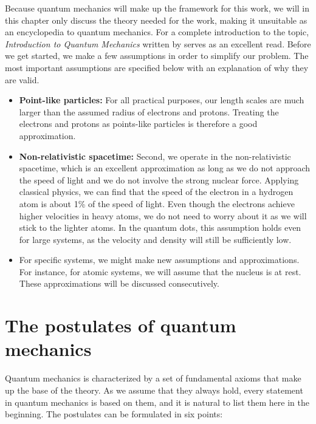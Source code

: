 Because quantum mechanics will make up the framework for this work, we will in this chapter only discuss the theory needed for the work, making it unsuitable as an encyclopedia to quantum mechanics. For a complete introduction to the topic, \textit{Introduction to Quantum Mechanics} written by \citet{griffiths_introduction_2005} serves as an excellent read. Before we get started, we make a few assumptions in order to simplify our problem. The most important assumptions are specified below with an explanation of why they are valid.

\begin{itemize}
	\item \textbf{Point-like particles:} For all practical purposes, our length scales are much larger than the assumed radius of electrons and protons. Treating the electrons and protons as points-like particles is therefore a good approximation. 
	
	\item \textbf{Non-relativistic spacetime:}  Second, we operate in the non-relativistic spacetime, which is an excellent approximation as long as we do not approach the speed of light and we do not involve the strong nuclear force. Applying classical physics, we can find that the speed of the electron in a hydrogen atom is about 1\% of the speed of light. Even though the electrons achieve higher velocities in heavy atoms, we do not need to worry about it as we will stick to the lighter atoms. In the quantum dots, this assumption holds even for large systems, as the velocity and density will still be sufficiently low.
	
	\item For specific systems, we might make new assumptions and approximations. For instance, for atomic systems, we will assume that the nucleus is at rest. These approximations will be discussed consecutively. 
\end{itemize}

\section{The postulates of quantum mechanics} \label{sec:postulates}
Quantum mechanics is characterized by a set of fundamental axioms that make up the base of the theory. As we assume that they always hold, every statement in quantum mechanics is based on them, and it is natural to list them here in the beginning. The postulates can be formulated in six points:

